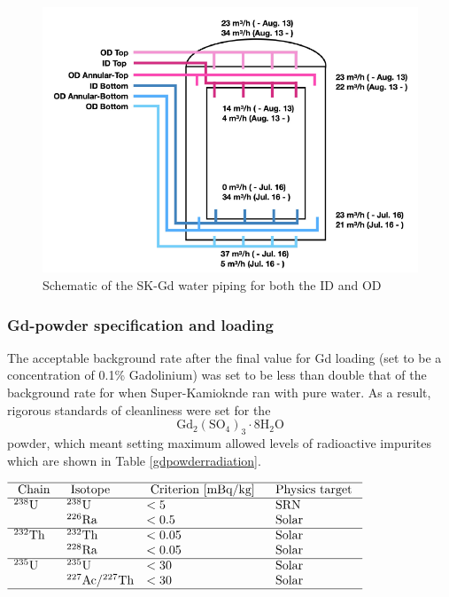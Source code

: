 \begin{figure}[H]
    \includegraphics[width=\textwidth]{Figures/gd_pipes.png}
    \caption{Schematic of the SK-Gd water piping for both the ID and OD}
    \label{fig:gd_pipes}
\end{figure}


\subsubsection{Gd-powder specification and loading}

The acceptable background rate after the final value for Gd loading (set to be a concentration of 0.1\% Gadolinium) was set to be less than double that of the background rate for when Super-Kamioknde ran with pure water. As a result, rigorous standards of cleanliness were set for the $$\mathrm{Gd}_{2}\left(\mathrm{SO}_{4}\right)_{3} \cdot 8 \mathrm{H}_{2} \mathrm{O}$$ powder, which meant setting maximum allowed levels of radioactive impurites which are shown in Table \ref{gdpowderradiation}.


\begin{table}[H]

$\begin{array}{llll}
\hline \text { Chain } & \text { Isotope } & \text { Criterion [mBq/kg] } & \text { Physics target } \\
\hline{ }^{238} \mathrm{U} & { }^{238} \mathrm{U} & <5 & \text { SRN } \\
& { }^{226} \mathrm{Ra} & <0.5 & \text { Solar } \\
\hline{ }^{232} \mathrm{Th} & { }^{232} \mathrm{Th} & <0.05 & \text { Solar } \\
& { }^{228} \mathrm{Ra} & <0.05 & \text { Solar } \\
\hline{ }^{235} \mathrm{U} & { }^{235} \mathrm{U} & <30 & \text { Solar } \\
& { }^{227} \mathrm{Ac} /{ }^{227} \mathrm{Th} & <30 & \text { Solar } \\
\hline
\end{array}
$
\label{gdpowderradiaton}
\end{table}


